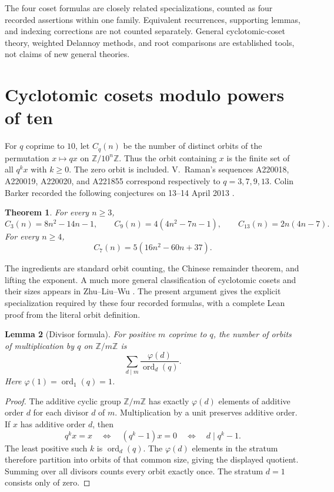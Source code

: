 \documentclass[11pt]{article}
\newtheorem{theorem}{Theorem}[section]
\newtheorem{lemma}[theorem]{Lemma}
\begin{document}
The four coset formulas are closely related specializations, counted as four
recorded assertions within one family. Equivalent recurrences, supporting
lemmas, and indexing corrections are not counted separately. General
cyclotomic-coset theory, weighted Delannoy methods, and root comparisons are
established tools, not claims of new general theories.

\section{Cyclotomic cosets modulo powers of ten}\label{sec:cosets-ten}

For $q$ coprime to $10$, let $C_q(n)$ be the number of distinct
orbits of the permutation $x\mapsto qx$ on $\mathbb Z/10^n\mathbb Z$.
Thus the orbit containing $x$ is the finite set of all $q^kx$ with
$k\ge0$. The zero orbit is included. V.~Raman's sequences
A220018, A220019, A220020, and A221855 correspond respectively to
$q=3,7,9,13$. Colin Barker recorded the following conjectures on
13--14 April 2013 \cite{oeis220018,oeis220019,oeis220020,oeis221855}.

\begin{theorem}\label{thm:cosets-ten}
For every $n\ge3$,
\[
 C_3(n)=8n^2-14n-1,\qquad
 C_9(n)=4(4n^2-7n-1),\qquad
 C_{13}(n)=2n(4n-7).
\]
For every $n\ge4$,
\[
 C_7(n)=5(16n^2-60n+37).
\]
\end{theorem}

The ingredients are standard orbit counting, the Chinese remainder
theorem, and lifting the exponent. A much more general classification
of cyclotomic cosets and their sizes appears in Zhu--Liu--Wu
\cite{zhu-liu-wu-cosets}. The present argument gives the explicit
specialization required by these four recorded formulas, with a
complete Lean proof from the literal orbit definition.

\begin{lemma}[Divisor formula]\label{lem:cosets-divisors}
For positive $m$ coprime to $q$, the number of orbits of multiplication
by $q$ on $\mathbb Z/m\mathbb Z$ is
\[
 \sum_{d\mid m}\frac{\varphi(d)}{\operatorname{ord}_d(q)}.
\]
Here $\varphi(1)=\operatorname{ord}_1(q)=1$.
\end{lemma}
\begin{proof}
The additive cyclic group $\mathbb Z/m\mathbb Z$ has exactly
$\varphi(d)$ elements of additive order $d$ for each divisor $d$ of
$m$. Multiplication by a unit preserves additive order. If $x$ has
additive order $d$, then
\[
 q^kx=x\quad\Longleftrightarrow\quad(q^k-1)x=0
 \quad\Longleftrightarrow\quad d\mid q^k-1.
\]
The least positive such $k$ is $\operatorname{ord}_d(q)$.
The $\varphi(d)$ elements in the stratum therefore partition into
orbits of that common size, giving the displayed quotient.
Summing over all divisors counts every orbit exactly once.
The stratum $d=1$ consists only of zero.
\end{proof}
\end{document}

